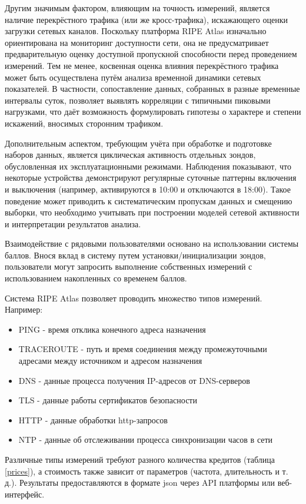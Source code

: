 Другим значимым фактором, влияющим на точность измерений, является наличие перекрёстного трафика (или же кросс-трафика), искажающего оценки загрузки сетевых каналов. Поскольку платформа RIPE Atlas изначально ориентирована на мониторинг доступности сети, она не предусматривает предварительную оценку доступной пропускной способности перед проведением измерений. Тем не менее, косвенная оценка влияния перекрёстного трафика может быть осуществлена путём анализа временной динамики сетевых показателей. В частности, сопоставление данных, собранных в разные временные интервалы суток, позволяет выявлять корреляции с типичными пиковыми нагрузками, что даёт возможность формулировать гипотезы о характере и степени искажений, вносимых сторонним трафиком.

Дополнительным аспектом, требующим учёта при обработке и подготовке наборов данных, является циклическая активность отдельных зондов, обусловленная их эксплуатационными режимами. Наблюдения показывают, что некоторые устройства демонстрируют регулярные суточные паттерны включения и выключения (например, активируются в 10:00 и отключаются в 18:00). Такое поведение может приводить к систематическим пропускам данных и смещению выборки, что необходимо учитывать при построении моделей сетевой активности и интерпретации результатов анализа.


Взаимодействие с рядовыми пользователями основано на использовании системы баллов. Внося вклад в систему путем установки/инициализации зондов, пользователи могут запросить выполнение собственных измерений с использованием накопленных со временем баллов.

Система RIPE Atlas позволяет проводить множество типов измерений. Например:
\begin{itemize}
	\item PING - время отклика конечного адреса назначения
	\item TRACEROUTE - путь и время соединения между промежуточными адресами между источником и  адресом назначения
	\item DNS - данные процесса получения IP-адресов от DNS-серверов
	\item TLS - данные работы сертификатов безопасности
	\item HTTP - данные обработки http-запросов
	\item NTP - данные об отслеживании процесса синхронизации часов в сети
\end{itemize}


Различные типы измерений требуют разного количества кредитов (таблица \ref{prices}), а стоимость также зависит от параметров (частота, длительность и т. д.). Результаты предоставляются в формате json через API платформы или веб-интерфейс.



